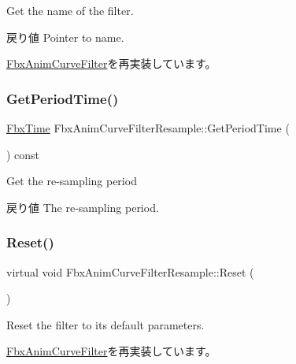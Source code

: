 Get the name of the filter. \begin{DoxyReturn}{戻り値}
Pointer to name. 
\end{DoxyReturn}


\hyperlink{class_fbx_anim_curve_filter_abd559d5052fbb072042e59241940a35c}{Fbx\+Anim\+Curve\+Filter}を再実装しています。

\mbox{\label{class_fbx_anim_curve_filter_resample_a0efe607fa3febdd058b03a7ac444bfd4}} 
\subsubsection{\texorpdfstring{Get\+Period\+Time()}{GetPeriodTime()}}
{\footnotesize\ttfamily \hyperlink{class_fbx_time}{Fbx\+Time} Fbx\+Anim\+Curve\+Filter\+Resample\+::\+Get\+Period\+Time (\begin{DoxyParamCaption}{ }\end{DoxyParamCaption}) const}

Get the re-\/sampling period \begin{DoxyReturn}{戻り値}
The re-\/sampling period. 
\end{DoxyReturn}
\mbox{\label{class_fbx_anim_curve_filter_resample_a149622ab0dd1ffd26ca1e59f31aaed93}} 
\subsubsection{\texorpdfstring{Reset()}{Reset()}}
{\footnotesize\ttfamily virtual void Fbx\+Anim\+Curve\+Filter\+Resample\+::\+Reset (\begin{DoxyParamCaption}{ }\end{DoxyParamCaption})\hspace{0.3cm}{\ttfamily [virtual]}}

Reset the filter to its default parameters. 

\hyperlink{class_fbx_anim_curve_filter_a57fb35baaaa85adb08946383cf40e811}{Fbx\+Anim\+Curve\+Filter}を再実装しています。

